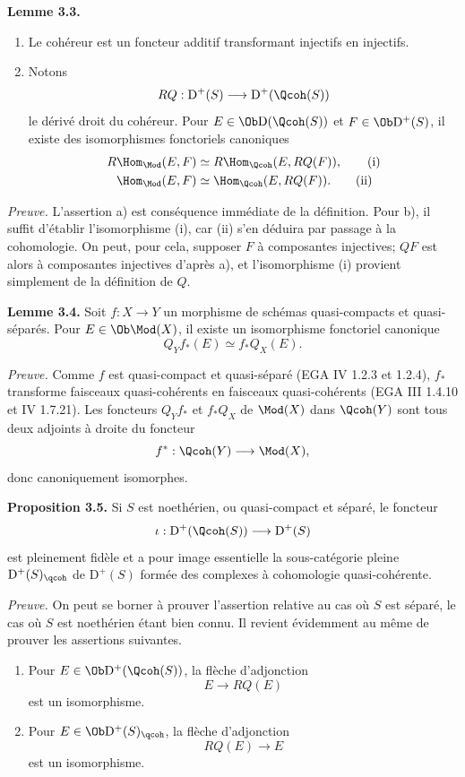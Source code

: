 \documentclass[11pt]{article}
\begin{document}
\textbf{Lemme 3.3.} \begin{enumerate}[label=\alph*)]
\item Le cohéreur est un foncteur additif transformant injectifs en injectifs.
\item Notons
\[
 RQ:\mathrm D^+(S)\longrightarrow \mathrm D^+(\Qcoh(S))
\]
le dérivé droit du cohéreur. Pour $E\in\Ob\mathrm D(\Qcoh(S))$ et $F\in\Ob\mathrm D^+(S)$, il existe des isomorphismes fonctoriels canoniques
\begin{align}
 R\Hom_{\Mod}(E,F)&\simeq R\Hom_{\Qcoh}(E,RQ(F)), \tag{i}\\
 \Hom_{\Mod}(E,F)&\simeq \Hom_{\Qcoh}(E,RQ(F)). \tag{ii}
\end{align}
\end{enumerate}

\emph{Preuve.} L'assertion a) est conséquence immédiate de la définition. Pour b), il suffit d'établir l'isomorphisme (i), car (ii) s'en déduira par passage à la cohomologie. On peut, pour cela, supposer $F$ à composantes injectives; $QF$ est alors à composantes injectives d'après a), et l'isomorphisme (i) provient simplement de la définition de $Q$.

\textbf{Lemme 3.4.} Soit $f:X\to Y$ un morphisme de schémas quasi-compacts et quasi-séparés. Pour $E\in\Ob\Mod(X)$, il existe un isomorphisme fonctoriel canonique
\[
 Q_Y f_*(E)\simeq f_*Q_X(E).
\]

\emph{Preuve.} Comme $f$ est quasi-compact et quasi-séparé (EGA IV 1.2.3 et 1.2.4), $f_*$ transforme faisceaux quasi-cohérents en faisceaux quasi-cohérents (EGA III 1.4.10 et IV 1.7.21). Les foncteurs $Q_Yf_*$ et $f_*Q_X$ de $\Mod(X)$ dans $\Qcoh(Y)$ sont tous deux adjoints à droite du foncteur
\[
 f^*: \Qcoh(Y)\longrightarrow \Mod(X),
\]
donc canoniquement isomorphes.

\textbf{Proposition 3.5.} Si $S$ est noethérien, ou quasi-compact et séparé, le foncteur
\[
 \iota:\mathrm D^+(\Qcoh(S))\longrightarrow \mathrm D^+(S)
\]
est pleinement fidèle et a pour image essentielle la sous-catégorie pleine $\mathrm D^+(S)_{\qcoh}$ de $\mathrm D^+(S)$ formée des complexes à cohomologie quasi-cohérente.

\emph{Preuve.} On peut se borner à prouver l'assertion relative au cas où $S$ est séparé, le cas où $S$ est noethérien étant bien connu. Il revient évidemment au même de prouver les assertions suivantes.

\begin{enumerate}[label=(3.5.\arabic*)]
\item Pour $E\in\Ob\mathrm D^+(\Qcoh(S))$, la flèche d'adjonction
\[
 E\longrightarrow RQ(E)
\]
est un isomorphisme.
\item Pour $E\in\Ob\mathrm D^+(S)_{\qcoh}$, la flèche d'adjonction
\[
 RQ(E)\longrightarrow E
\]
est un isomorphisme.
\end{enumerate}
\end{document}
